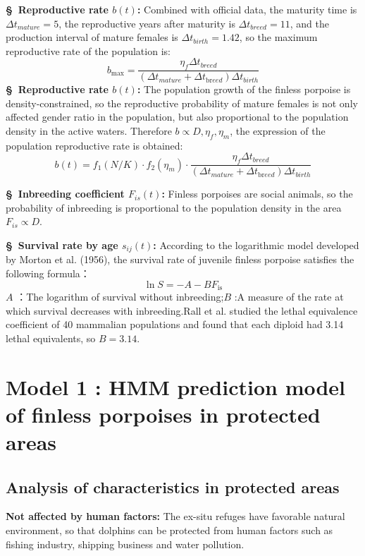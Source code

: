 \documentclass[12pt]{article}  %
\begin{document}
\textbf{\S \ Reproductive rate $b(t)$: }Combined with official data, the maturity time is $\Delta {{t}_{mature}}=5$, the reproductive years after maturity is $\Delta {{t}_{breed}}=11$, and the production interval of mature females is $\Delta {{t}_{birth}}=1.42$, so the maximum reproductive rate of the population is:
\begin{equation}%
{{b}_{\max }}=\frac{{{\eta }_{f}}\Delta {{t}_{breed}}}{(\Delta {{t}_{mature}}+\Delta {{t}_{\text{br}eed}})\Delta {{t}_{birth}}}
\end{equation}
\textbf{\S \ Reproductive rate $b(t)$: }
The population growth of the finless porpoise is density-constrained, so the reproductive probability of mature females is not only affected gender ratio in the population, but also proportional to the population density in the active waters. Therefore $b\propto D,{{\eta }_{f}},{{\eta }_{m}}$, the expression of the population reproductive rate is obtained:
\begin{equation}%
b(t)={{f}_{1}}(N/K)\cdot {{f}_{2}}({{\eta }_{m}})\cdot \frac{{{\eta }_{f}}\Delta {{t}_{breed}}}{(\Delta {{t}_{mature}}+\Delta {{t}_{\text{br}eed}})\Delta {{t}_{birth}}}
\end{equation}

\textbf{\S \ Inbreeding coefficient ${{F}_{is}}(t)$: }Finless porpoises are social animals, so the probability of inbreeding is proportional to the population density in the area ${{F}_{is}}\propto D$.

\textbf{\S \ Survival rate by age ${{s}_{ij}}(t)$: }According to the logarithmic model developed by Morton et al. (1956), the survival rate of juvenile finless porpoise satisfies the following formula：
\begin{equation}%
\ln S=-A-B{{F}_{\text{is}}}
\end{equation}
$A$ ：The logarithm of survival without inbreeding;$B$ :A measure of the rate at which survival decreases with inbreeding.Rall et al. studied the lethal equivalence coefficient of 40 mammalian populations and found that each diploid had 3.14 lethal equivalents, so $B=3.14$.

\section{Model 1 : HMM prediction model of finless porpoises in protected areas}
\subsection{Analysis of characteristics in protected areas}
\textbf{Not affected by human factors: }
The ex-situ refuges have favorable natural environment, so that dolphins can be protected from human factors such as fishing industry, shipping business and water pollution.
\end{document}
